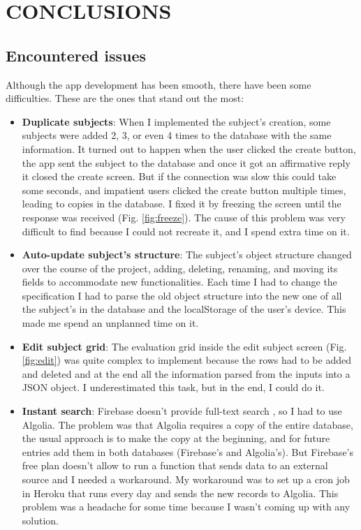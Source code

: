 \chapter{CONCLUSIONS}
\label{chap:review}

\section{Encountered issues}

Although the app development has been smooth, there have been some difficulties. These are the ones that stand out the most:

\begin{itemize}
    \item \textbf{Duplicate subjects}: When I implemented the subject's creation, some subjects were added 2, 3, or even 4 times to the database with the same information. It turned out to happen when the user clicked the create button, the app sent the subject to the database and once it got an affirmative reply it closed the create screen. But if the connection was slow this could take some seconds, and impatient users clicked the create button multiple times, leading to copies in the database. I fixed it by freezing the screen until the response was received (Fig. \ref{fig:freeze}). The cause of this problem was very difficult to find because I could not recreate it, and I spend extra time on it.
    \item \textbf{Auto-update subject's structure}: The subject's object structure changed over the course of the project, adding, deleting, renaming, and moving its fields to accommodate new functionalities. Each time I had to change the specification I had to parse the old object structure into the new one of all the subject's in the database and the localStorage of the user's device. This made me spend an unplanned time on it.
    \item \textbf{Edit subject grid}: The evaluation grid inside the edit subject screen (Fig. \ref{fig:edit}) was quite complex to implement because the rows had to be added and deleted and at the end all the information parsed from the inputs into a JSON object. I underestimated this task, but in the end, I could do it.
    \item \textbf{Instant search}: Firebase doesn't provide full-text search \cite{algolia-why}, so I had to use Algolia. The problem was that Algolia requires a copy of the entire database, the usual approach is to make the copy at the beginning, and for future entries add them in both databases (Firebase's and Algolia's). But Firebase's free plan doesn't allow to run a function that sends data to an external source and I needed a workaround. My workaround was to set up a cron job in Heroku that runs every day and sends the new records to Algolia. This problem was a headache for some time because I wasn't coming up with any solution.
\end{itemize}

